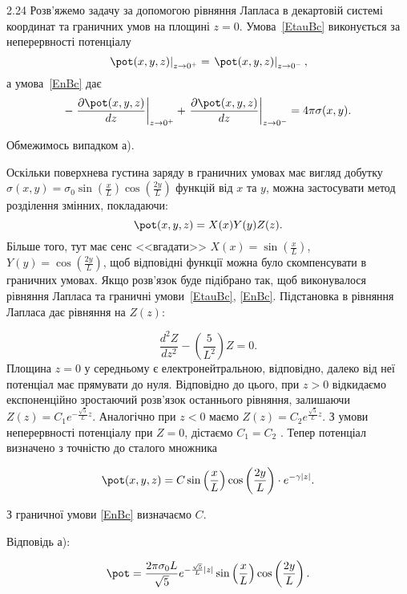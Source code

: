 \begin{Solution}{2.{24}}
    Розв'яжемо задачу за допомогою рівняння Лапласа в декартовій системі координат  та граничних умов на площині $z = 0$. Умова~\eqref{EtauBc} виконується за неперервності потенціалу
	\begin{equation*}\label{continuity}
		\left.\pot(x,y,z)\right|_{z \to 0^+} = \left.\pot(x,y,z)\right|_{z \to 0^-},
	\end{equation*}
	а умова~\eqref{EnBc} дає
	\begin{equation*}\label{boundary}
		-\left. \frac{\partial \pot(x,y,z)}{dz}\right|_{z \to 0^+} + \left. \frac{\partial \pot(x,y,z)}{dz}\right|_{z \to 0^-} =4\pi\sigma(x,y).
	\end{equation*}

	Обмежимось випадком а).

	Оскільки поверхнева густина заряду в граничних умовах має вигляд добутку $\sigma(x, y) = \sigma_0 \sin\left( \frac{x}{L}\right) \cos\left( \frac{2y}{L}\right) $ функцій від $x$ та $y$, можна застосувати метод розділення змінних, покладаючи:
    \[
        \pot(x,y,z) = X(x)Y(y)Z(z).
    \]
Більше того, тут має сенс <<вгадати>> $X(x) = \sin\left(\frac{x}{L}\right) $, $Y(y) =
\cos\left(\frac{2y}{L}\right) $, щоб відповідні функції можна було скомпенсувати в граничних умовах.
Якщо розв’язок буде підібрано так, щоб виконувалося рівняння Лапласа та граничні умови~\eqref{EtauBc},
\eqref{EnBc}.%
Підстановка в рівняння Лапласа дає рівняння на $Z(z)$:

\begin{equation*}
    \frac{d^2Z}{dz^2} - \left( \frac{5}{L^2}\right) Z = 0.
\end{equation*}
Площина  $z = 0$ у середньому є електронейтральною, відповідно, далеко від неї потенціал має прямувати до нуля. Відповідно до цього, при $z >0$  відкидаємо експоненційно зростаючий розв’язок останнього рівняння, залишаючи $ Z(z) = C_1  e^{-\frac{\sqrt5}{L}z} $. Аналогічно при $z < 0$  маємо $ Z(z) = C_2  e^{\frac{\sqrt5}{L}z} $. З умови неперервності потенціалу при $Z = 0$, дістаємо $C_1 = C_2$ . Тепер потенціал визначено з точністю до сталого множника


	\begin{equation*}
		\pot (x,y,z) = C \sin\left( \frac{x}{L} \right)   \cos\left( \frac{2y}{L} \right)  \cdot e^{-\gamma |z|}.
	\end{equation*}

З граничної умови \eqref{EnBc} визначаємо $C$.

Відповідь а):

	\begin{equation*}
		\pot = \frac{2\pi\sigma_0 L}{\sqrt{5}}e^{-\frac{\sqrt{5}}{L}|z|}\sin\left( \frac{x}{L}\right) \cos\left( \frac{2y}{L}\right) .
	\end{equation*}
\end{Solution}
